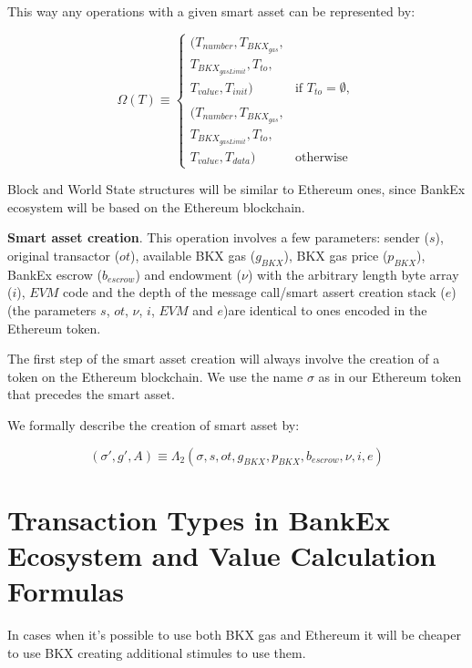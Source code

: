 \documentclass{article}
\begin{document}
This way any operations with a given smart asset can be represented by:

\begin{equation}
    \Omega(T) \equiv
    \begin{cases} 
        (T_{number}, T_{BKX_{gas}}, \\T_{BKX_{gasLimit}}, T_{to}, \\T_{value}, T_{init}) & \text{if } T_{to} = \emptyset, \\
        \\
        (T_{number}, T_{BKX_{gas}}, \\T_{BKX_{gasLimit}}, T_{to}, \\T_{value}, T_{data}) & \text{otherwise}
    \end{cases}
\end{equation}

Block and World State \cite{wood2014ethereum} structures will be similar to Ethereum ones, since BankEx ecosystem will be based on the Ethereum blockchain.

\textbf{Smart asset creation}. This operation involves a few parameters: sender ($s$), original transactor ($ot$), available BKX gas ($g_{BKX}$), BKX gas price ($p_{BKX}$), BankEx escrow ($b_{escrow}$) and endowment ($\nu$) with the arbitrary length byte array ($i$), $EVM$ code and the depth of the message call/smart assert creation stack ($e$) (the parameters $s$, $ot$, $\nu$, $i$, $EVM$ and $e$)are identical to ones encoded in the Ethereum token.

The first step of the smart asset creation will always involve the creation of a token on the Ethereum blockchain. We use the name $\sigma$ as in our Ethereum token that precedes the smart asset.

We formally describe the creation of smart asset by:

\begin{equation}
    \left(\sigma', g', A\right) \equiv \Lambda_2\left(\sigma, s, ot, g_{BKX}, p_{BKX}, b_{escrow}, \nu, i, e\right)
\end{equation}

\section{Transaction Types in BankEx Ecosystem and Value Calculation Formulas}

In cases when it's possible to use both BKX gas and Ethereum it will be cheaper to use BKX creating additional stimules to use them.
\end{document}
